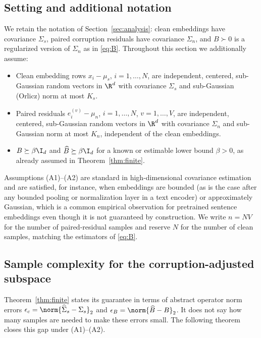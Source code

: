 \subsection{Setting and additional notation}
\label{sec:extensions-setting}

We retain the notation of Section~\ref{sec:analysis}: clean embeddings have
covariance $\Sigma_s$, paired corruption residuals have covariance
$\Sigma_n$, and $B\succ0$ is a regularized version of $\Sigma_n$ as in
\cref{eq:B}. Throughout this section we additionally assume:
\begin{itemize}[leftmargin=1.6em]
 \item[(A1)] Clean embedding rows $x_i-\mu_s$, $i=1,\dots,N$, are
 independent, centered, sub-Gaussian random vectors in $\R^d$ with
 covariance $\Sigma_s$ and sub-Gaussian (Orlicz) norm at most $K_s$.
 \item[(A2)] Paired residuals $e_i^{(v)}-\mu_n$, $i=1,\dots,N$,
 $v=1,\dots,V$, are independent, centered, sub-Gaussian random vectors in
 $\R^d$ with covariance $\Sigma_n$ and sub-Gaussian norm at most $K_n$,
 independent of the clean embeddings.
 \item[(A3)] $B\succeq\beta\I_d$ and $\widehat B\succeq\beta\I_d$ for a
 known or estimable lower bound $\beta>0$, as already assumed in
 Theorem~\ref{thm:finite}.
\end{itemize}
Assumptions (A1)--(A2) are standard in high-dimensional covariance
estimation \citep{vershynin2018high} and are satisfied, for instance, when
embeddings are bounded (as is the case after any bounded pooling or
normalization layer in a text encoder) or approximately Gaussian, which is
a common empirical observation for pretrained sentence embeddings even
though it is not guaranteed by construction. We write $n=NV$ for the
number of paired-residual samples and reserve $N$ for the number of clean
samples, matching the estimators of \cref{eq:B}.

\subsection{Sample complexity for the corruption-adjusted subspace}
\label{sec:sample-complexity}

Theorem~\ref{thm:finite} states its guarantee in terms of abstract operator
norm errors $\epsilon_c=\norm{\widehat\Sigma_s-\Sigma_s}_2$ and
$\epsilon_B=\norm{\widehat B-B}_2$. It does not say how many samples are
needed to make these errors small. The following theorem closes this gap
under (A1)--(A2).


